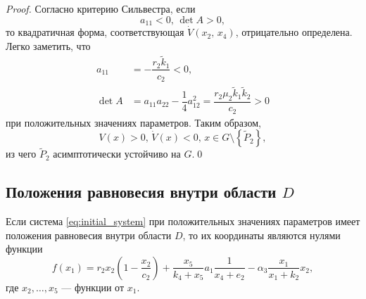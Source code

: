 \documentclass[14pt,a4paper]{extarticle}
\begin{document}
\begin{proof}
		Согласно критерию Сильвестра, если 
		\[a_{11}<0,\, \det A>0,\]
		то квадратичная форма, соответствующая $\dot{V}(x_2,\, x_4)$, отрицательно определена. Легко заметить, что 
		\begin{align*}
			a_{11} &= -\dfrac{r_2\tilde{k}_1}{c_2}<0,\\
			\det A &= a_{11}a_{22}-\dfrac{1}{4}a^2_{12} = \dfrac{r_2\mu_2\tilde{k}_1\tilde{k}_2}{c_2}>0
		\end{align*}
		при положительных значениях параметров. Таким образом, 
		\[V(x)>0,\, \dot{V}(x)<0,\, x\in G\setminus\left\{\tilde{P}_2\right\},\]
		из чего $\tilde{P}_2$ асимптотически устойчиво на $G$.\qed
	\end{proof}
	
	\subsection{Положения равновесия внутри области $D$}
	\begin{theorem}\label{th:inner_eqpoint}
		Если система \ref{eq:initial_system} при положительных значениях параметров имеет положения равновесия внутри области $D$, то их координаты являются нулями функции
		\[f(x_1)=r_2x_2\left(1-\dfrac{x_2}{c_2}\right)+\dfrac{x_5}{k_4+x_5}a_1\dfrac{1}{x_4+e_2}-\alpha_3\dfrac{x_1}{x_1+k_2}x_2,\]
		где $x_2,\ldots,x_5$ --- функции от $x_1$.
	\end{theorem}
\end{document}
